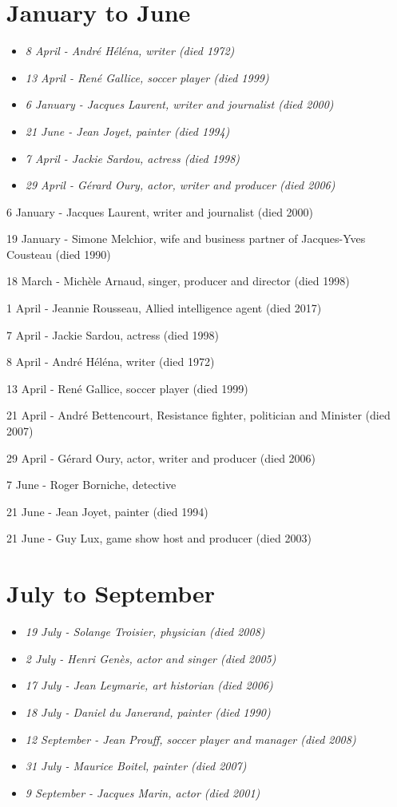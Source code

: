 \section{January to June}\label{january-to-june}

\begin{itemize}
\item
  \emph{8 April - André Héléna, writer (died 1972)}
\item
  \emph{13 April - René Gallice, soccer player (died 1999)}
\item
  \emph{6 January - Jacques Laurent, writer and journalist (died 2000)}
\item
  \emph{21 June - Jean Joyet, painter (died 1994)}
\item
  \emph{7 April - Jackie Sardou, actress (died 1998)}
\item
  \emph{29 April - Gérard Oury, actor, writer and producer (died 2006)}
\end{itemize}

6 January - Jacques Laurent, writer and journalist (died 2000)

19 January - Simone Melchior, wife and business partner of Jacques-Yves
Cousteau (died 1990)

18 March - Michèle Arnaud, singer, producer and director (died 1998)

1 April - Jeannie Rousseau, Allied intelligence agent (died 2017)

7 April - Jackie Sardou, actress (died 1998)

8 April - André Héléna, writer (died 1972)

13 April - René Gallice, soccer player (died 1999)

21 April - André Bettencourt, Resistance fighter, politician and
Minister (died 2007)

29 April - Gérard Oury, actor, writer and producer (died 2006)

7 June - Roger Borniche, detective

21 June - Jean Joyet, painter (died 1994)

21 June - Guy Lux, game show host and producer (died 2003)

\section{July to September}\label{july-to-september}

\begin{itemize}
\item
  \emph{19 July - Solange Troisier, physician (died 2008)}
\item
  \emph{2 July - Henri Genès, actor and singer (died 2005)}
\item
  \emph{17 July - Jean Leymarie, art historian (died 2006)}
\item
  \emph{18 July - Daniel du Janerand, painter (died 1990)}
\item
  \emph{12 September - Jean Prouff, soccer player and manager (died
  2008)}
\item
  \emph{31 July - Maurice Boitel, painter (died 2007)}
\item
  \emph{9 September - Jacques Marin, actor (died 2001)}
\end{itemize}

